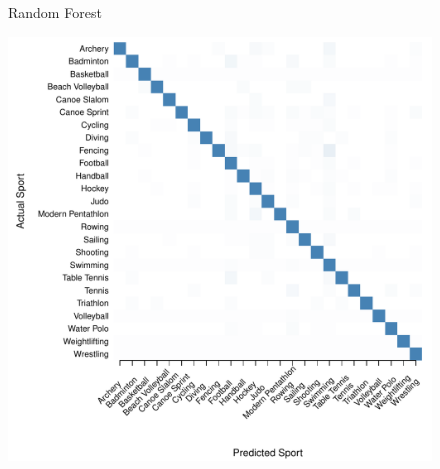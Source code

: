 \begin{figure}
\begin{center}
\begin{minipage}{0.20\textwidth}
\begin{center}
    \end{center}
  \end{minipage}


    Random Forest \\
  \begin{minipage}{0.20\textwidth}
    \begin{center}
      \includegraphics[scale=0.20]{../graphics/sportRF-trn.pdf}
    \end{center}
  \end{minipage}
  \hspace{0.05\textwidth}
  \begin{minipage}{0.20\textwidth}
    \begin{center}

\end{center}
\end{minipage}
\end{center}
\end{figure}
